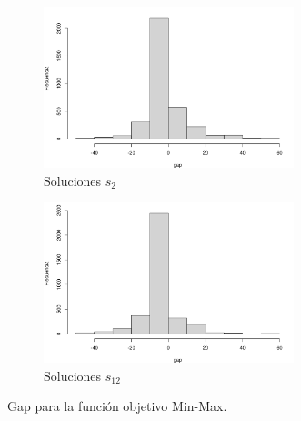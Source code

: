 \documentclass[preprint,12pt,authoryear]{elsarticle}
\begin{document}
\begin{figure}
	\begin{subfigure}{\textwidth}
		\centering
		\includegraphics[width=0.8\textwidth]{hist_gap2.png}
		\caption{Soluciones $s_2$}
	\end{subfigure}
	\begin{subfigure}{\textwidth}
		\centering
		\includegraphics[width=0.8\textwidth]{hist_gap12.png}
		\caption{Soluciones $s_{12}$}
	\end{subfigure}
\caption{Gap para la función objetivo Min-Max.}
\label{histob2}
\end{figure}
\end{document}
